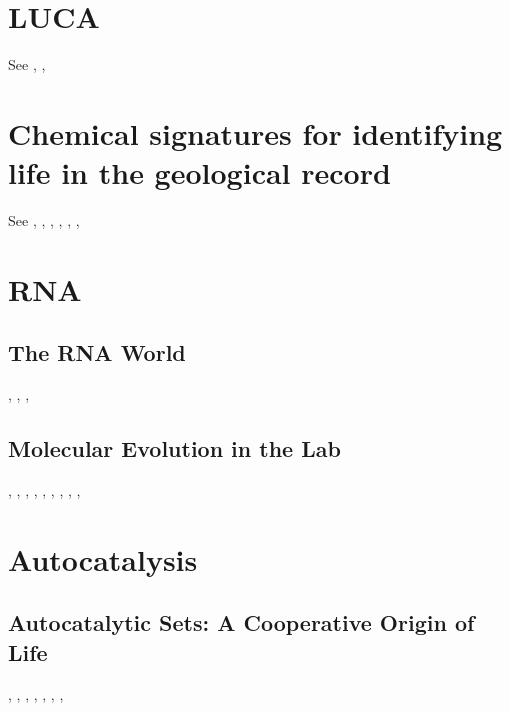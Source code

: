 \documentclass[]{article}
\begin{document}
\section{LUCA}

See \cite{penny1999nature}, \cite{weiss2016physiology}, \cite{torino2013piecing}

\section{Chemical signatures for identifying life in the geological record }

See \cite{sharp2017principles}, \cite{bell2015potentially}, \cite{rosing199913c}, \cite{ueno2006evidence}, \cite{shen2001isotopic}, \cite{summons19992}, \cite{han1992megascopic}

\section{RNA}

\subsection{The RNA World}
\cite{robertson2012origins}, \cite{joyce2018protocells}, \cite{hud2018searching},  \cite{hoshika2019hachimoji}

\subsection{Molecular Evolution in the Lab}

\cite{joyce2007forty}, \cite{seelig2007selection}, \cite{chen2007ribozyme}, \cite{gold2012aptamers}, \cite{sefah2014vitro}, \cite{pinheiro2012synthetic}, \cite{mansy2007structure}, \cite{bartel1993isolation}, \cite{petrie2014limits}, \cite{pressman2019mapping}

\section{Autocatalysis}

\subsection{Autocatalytic Sets: A Cooperative Origin of Life}
\cite{wim2017origin}, \cite{hordijk2017chasing}, \cite{wim2019wandering}, \cite{patzke2007self}, \cite{vaidya2012spontaneous}, \cite{ashkenasy2004design}, \cite{hordijk2012structure}, \cite{sousa2015autocatalytic}
\end{document}
